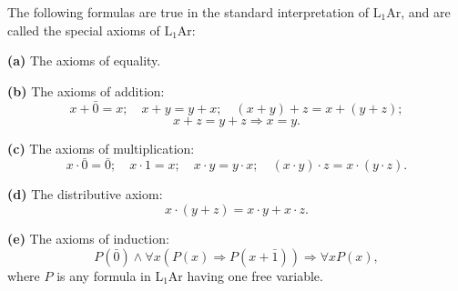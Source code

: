 The following formulas are true in the standard interpretation of $\mathrm{L}_1\mathrm{Ar}$, and are called the special axioms of $\mathrm{L}_1\mathrm{Ar}$:

\textbf{(a)} The axioms of equality.

\textbf{(b)} The axioms of addition:
$$x + \bar{0} = x; \quad x + y = y + x; \quad (x + y) + z = x + (y + z);$$
$$x + z = y + z \Rightarrow x = y.$$

\textbf{(c)} The axioms of multiplication:
$$x \cdot \bar{0} = \bar{0}; \quad x \cdot 1 = x; \quad x \cdot y = y \cdot x; \quad (x \cdot y) \cdot z = x \cdot (y \cdot z).$$

\textbf{(d)} The distributive axiom:
$$x \cdot (y + z) = x \cdot y + x \cdot z.$$

\textbf{(e)} The axioms of induction:
$$P(\bar{0}) \wedge \forall x(P(x) \Rightarrow P(x + \bar{1})) \Rightarrow \forall x P(x),$$
where $P$ is any formula in $\mathrm{L}_1\mathrm{Ar}$ having one free variable.
